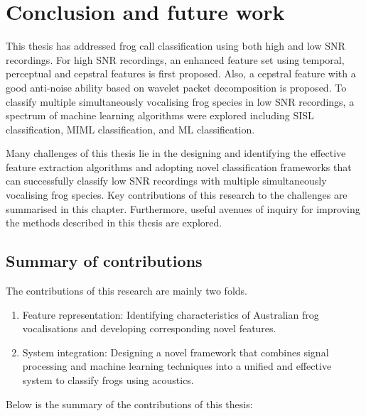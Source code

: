 
\chapter[Conclusion]{Conclusion and future work}
\label{cha:cha8Conclusions}

This thesis has addressed frog call classification using both high and low SNR recordings. For high SNR recordings, an enhanced feature set using temporal, perceptual and cepstral features is first proposed. Also, a cepstral feature with a good anti-noise ability based on wavelet packet decomposition is proposed.
To classify multiple simultaneously vocalising frog species in low SNR recordings, a spectrum of machine learning algorithms were explored including SISL classification, MIML classification, and ML classification. 

Many challenges of this thesis lie in the designing and identifying the effective feature extraction algorithms and adopting novel classification frameworks that can successfully classify low SNR recordings with multiple simultaneously vocalising frog species. 
Key contributions of this research to the challenges are summarised in this chapter. Furthermore, useful avenues of inquiry for improving the methods described in this thesis are explored.

\section{Summary of contributions}
	
The contributions of this research are mainly two folds.

\begin{enumerate}
\item Feature representation: Identifying characteristics of Australian frog vocalisations and developing corresponding novel features.

\item System integration: Designing a novel framework that combines signal processing and machine learning techniques into a unified and effective system to classify frogs using acoustics.


\end{enumerate}

Below is the summary of the contributions of this thesis:

	

